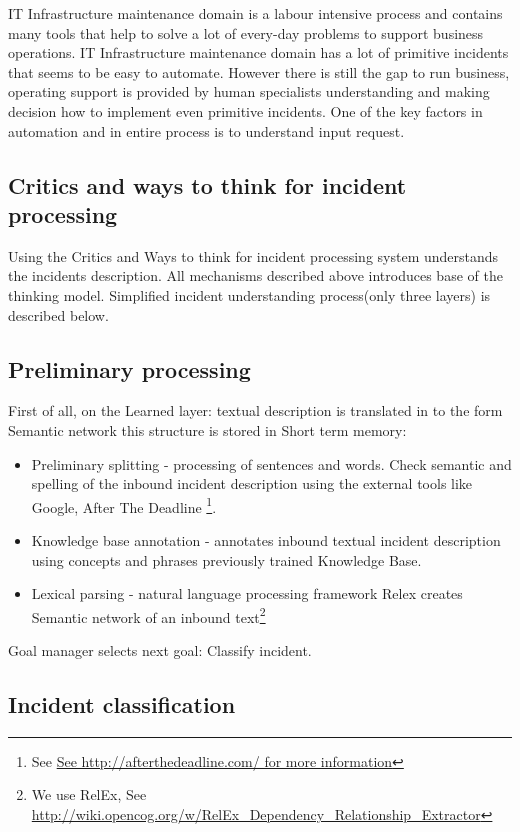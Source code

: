 \documentclass[conference]{IEEEtran}
\begin{document}
IT Infrastructure maintenance domain is a labour intensive process and contains many tools that help to solve a lot of every-day problems to support business operations. IT Infrastructure maintenance domain has a lot of primitive incidents that seems to be easy to automate. However there is still the gap to run business, operating support is provided by human specialists understanding and making decision how to implement even primitive incidents. One of the key factors in automation and in entire process is to understand input request.



\subsection{Critics and ways to think for incident processing}
Using the Critics and Ways to think for incident processing system understands the incidents description.
All mechanisms described above introduces base of the thinking model. Simplified incident understanding process(only three layers) is described below.

\subsection{Preliminary processing}

First of all, on the Learned layer: textual description is translated in to the form Semantic network this structure is stored in Short term memory:

\begin{itemize}
  \item Preliminary splitting - processing of sentences and words. Check semantic and spelling of the inbound incident description using the external tools like Google, After The Deadline \footnote{See \url{See http://afterthedeadline.com/ for more information}}.
  \item Knowledge base annotation - annotates inbound textual incident description using concepts and phrases previously trained Knowledge Base.
  \item Lexical parsing - natural language processing framework Relex creates Semantic network of an inbound text\footnote{We use RelEx, See \url{http://wiki.opencog.org/w/RelEx_Dependency_Relationship_Extractor}}
\end{itemize}

Goal manager selects next goal: Classify incident.

\subsection{Incident classification}
\end{document}
